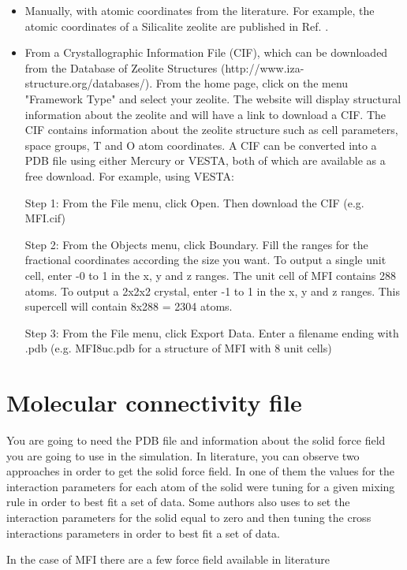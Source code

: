 \begin{itemize}
\item Manually, with atomic coordinates from the literature. 
For example, the atomic coordinates of a Silicalite zeolite are published in Ref. \cite{Meier:1981}.

\item From a Crystallographic Information File (CIF), which can be downloaded from
the Database of Zeolite Structures (http://www.iza-structure.org/databases/).
From the home page, click on the menu "Framework Type" and select your zeolite. 
The website will display structural information about the zeolite and will have 
a link to download a CIF. The CIF contains information about the 
zeolite structure such as cell parameters, space groups, T and O atom coordinates. 
A CIF can be converted into a PDB file using either Mercury or VESTA, both of which
are available as a free download. 
For example, using VESTA:

Step 1:
From the File menu, click Open. Then download the CIF (e.g. MFI.cif)

Step 2:
From the Objects menu, click Boundary. Fill the ranges for the fractional 
coordinates according the size you want. To output a single unit cell, enter -0 to 1
in the x, y and z ranges. 
The unit cell of MFI contains 288 atoms. 
To output a 2x2x2 crystal, enter -1 to 1 in the x, y and z ranges. 
This supercell will contain 8x288 = 2304 atoms.

Step 3:
From the File menu, click Export Data. Enter a filename ending with .pdb (e.g. MFI8uc.pdb for a structure of MFI with 8 unit cells)
\end{itemize}

\section{Molecular connectivity file}\label{sec:solid_mcf}
You are going to need the PDB file and information about the solid force field you are going to use in the simulation.
In literature, you can observe two approaches in order to get the solid force field. 
In one of them the values for the interaction parameters for each atom of the solid were 
tuning for a given mixing rule in order to best fit a set of data. 
Some authors also uses to set the interaction parameters for the solid equal to zero and 
then tuning the cross interactions parameters in order to best fit a set of data.

In the case of MFI there are a few force field available in literature

